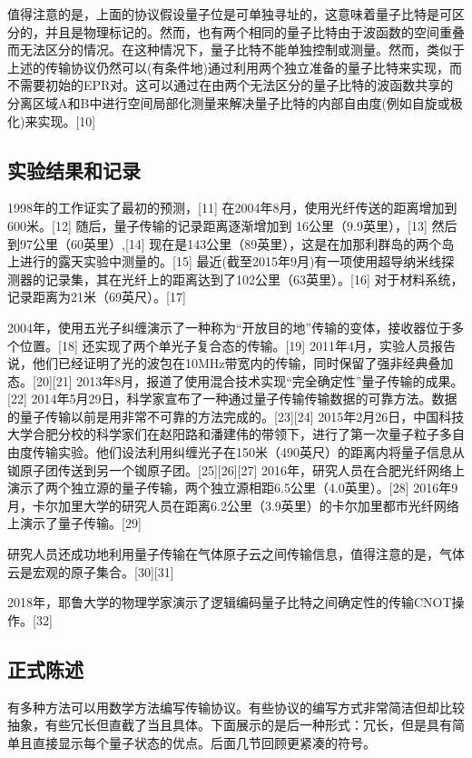 值得注意的是，上面的协议假设量子位是可单独寻址的，这意味着量子比特是可区分的，并且是物理标记的。然而，也有两个相同的量子比特由于波函数的空间重叠而无法区分的情况。在这种情况下，量子比特不能单独控制或测量。然而，类似于上述的传输协议仍然可以(有条件地)通过利用两个独立准备的量子比特来实现，而不需要初始的EPR对。这可以通过在由两个无法区分的量子比特的波函数共享的分离区域A和B中进行空间局部化测量来解决量子比特的内部自由度(例如自旋或极化)来实现。[10]

\subsection{实验结果和记录}

1998年的工作证实了最初的预测，[11] 在2004年8月，使用光纤传送的距离增加到600米。[12] 随后，量子传输的记录距离逐渐增加到 16公里（9.9英里），[13] 然后到97公里（60英里）,[14] 现在是143公里（89英里），这是在加那利群岛的两个岛上进行的露天实验中测量的。[15] 最近(截至2015年9月)有一项使用超导纳米线探测器的记录集，其在光纤上的距离达到了102公里（63英里）。[16] 对于材料系统，记录距离为21米（69英尺）。[17]

2004年，使用五光子纠缠演示了一种称为“开放目的地”传输的变体，接收器位于多个位置。[18] 还实现了两个单光子复合态的传输。[19] 2011年4月，实验人员报告说，他们已经证明了光的波包在10MHz带宽内的传输，同时保留了强非经典叠加态。[20][21] 2013年8月，报道了使用混合技术实现“完全确定性”量子传输的成果。[22] 2014年5月29日，科学家宣布了一种通过量子传输传输数据的可靠方法。数据的量子传输以前是用非常不可靠的方法完成的。[23][24] 2015年2月26日，中国科技大学合肥分校的科学家们在赵阳路和潘建伟的带领下，进行了第一次量子粒子多自由度传输实验。他们设法利用纠缠光子在150米（490英尺）的距离内将量子信息从铷原子团传送到另一个铷原子团。[25][26][27] 2016年，研究人员在合肥光纤网络上演示了两个独立源的量子传输，两个独立源相距6.5公里（4.0英里）。[28] 2016年9月，卡尔加里大学的研究人员在距离6.2公里（3.9英里）的卡尔加里都市光纤网络上演示了量子传输。[29]

研究人员还成功地利用量子传输在气体原子云之间传输信息，值得注意的是，气体云是宏观的原子集合。[30][31]

2018年，耶鲁大学的物理学家演示了逻辑编码量子比特之间确定性的传输CNOT操作。[32]

\subsection{正式陈述}

有多种方法可以用数学方法编写传输协议。有些协议的编写方式非常简洁但却比较抽象，有些冗长但直截了当且具体。下面展示的是后一种形式：冗长，但是具有简单且直接显示每个量子状态的优点。后面几节回顾更紧凑的符号。

